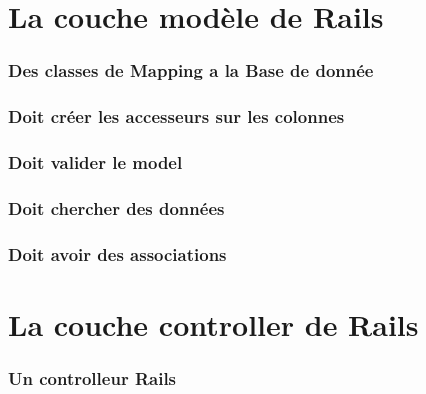 \documentclass{beamer}
\begin{document}
\section{La couche mod\`ele de Rails}

\begin{frame}
    \frametitle{Des classes de Mapping a la Base de donn\'ee}
    \begin{center}
        
    \end{center}
\end{frame}

\begin{frame}
    \frametitle{Doit cr\'eer les accesseurs sur les colonnes}
    \begin{center}
        
    \end{center}
\end{frame}

\begin{frame}
    \frametitle{Doit valider le model}
    \begin{center}
        
    \end{center}
\end{frame}

\begin{frame}
    \frametitle{Doit chercher des donn\'ees}
    \begin{center}
        
    \end{center}
\end{frame}

\begin{frame}
    \frametitle{Doit avoir des associations}
    \begin{center}
        
    \end{center}
\end{frame}

\section{La couche controller de Rails}

\begin{frame}
    \frametitle{Un controlleur Rails}
    \begin{center}
        
    \end{center}
\end{frame}
\end{document}
